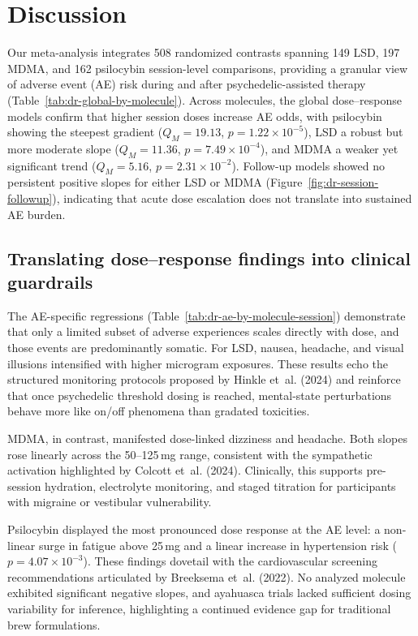 \section{Discussion}

Our meta-analysis integrates 508 randomized contrasts spanning 149 LSD, 197 MDMA, and 162 psilocybin session-level comparisons, providing a granular view of adverse event (AE) risk during and after psychedelic-assisted therapy (Table~\ref{tab:dr-global-by-molecule}).
Across molecules, the global dose--response models confirm that higher session doses increase AE odds, with psilocybin showing the steepest gradient ($Q_M=19.13$, $p=1.22\times10^{-5}$), LSD a robust but more moderate slope ($Q_M=11.36$, $p=7.49\times10^{-4}$), and MDMA a weaker yet significant trend ($Q_M=5.16$, $p=2.31\times10^{-2}$).
Follow-up models showed no persistent positive slopes for either LSD or MDMA (Figure~\ref{fig:dr-session-followup}), indicating that acute dose escalation does not translate into sustained AE burden.

\subsection{Translating dose--response findings into clinical guardrails}

The AE-specific regressions (Table~\ref{tab:dr-ae-by-molecule-session}) demonstrate that only a limited subset of adverse experiences scales directly with dose, and those events are predominantly somatic.
For LSD, nausea, headache, and visual illusions intensified with higher microgram exposures.
These results echo the structured monitoring protocols proposed by Hinkle et~al. (2024) and reinforce that once psychedelic threshold dosing is reached, mental-state perturbations behave more like on/off phenomena than gradated toxicities.

MDMA, in contrast, manifested dose-linked dizziness and headache.
Both slopes rose linearly across the 50--125\,mg range, consistent with the sympathetic activation highlighted by Colcott et~al. (2024).
Clinically, this supports pre-session hydration, electrolyte monitoring, and staged titration for participants with migraine or vestibular vulnerability.

Psilocybin displayed the most pronounced dose response at the AE level: a non-linear surge in fatigue above 25\,mg and a linear increase in hypertension risk ($p=4.07\times10^{-3}$).
These findings dovetail with the cardiovascular screening recommendations articulated by Breeksema et~al. (2022).
No analyzed molecule exhibited significant negative slopes, and ayahuasca trials lacked sufficient dosing variability for inference, highlighting a continued evidence gap for traditional brew formulations.

